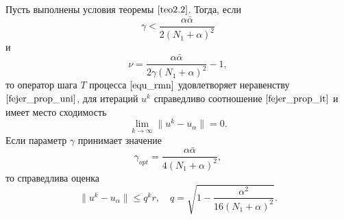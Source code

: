\begin{theorem} \label{teo2.3} 
	Пусть выполнены условия теоремы $\ref{teo2.2}$. Тогда, если
	\begin{equation}\label{ineq2.12}
	\gamma<\frac{\alpha\bar\alpha}{2(N_1+\alpha)^2}
	\end{equation}
	и \begin{equation}\label{eq2.13}
	\nu=\frac{\alpha\bar\alpha}{2\gamma(N_1+\alpha)^2}-1,
	\end{equation}
	то оператор шага $T$ процесса $\eqref{equ_rmn}$ удовлетворяет неравенству $\eqref{fejer_prop_uni}$, для итераций $u^k$ справедливо соотношение $\eqref{fejer_prop_it}$ и имеет место сходимость
	\begin{equation}\label{eq2.14}
	\lim_{k\to\infty}\|u^k-u_\alpha\|=0.
	\end{equation}
	Если параметр $\gamma$ принимает значение \begin{equation}\label{eq2.15}
	{\gamma}_{opt}=\frac{\alpha\bar\alpha}{4(N_1+\alpha)^2},
	\end{equation} то справедлива оценка \begin{equation}\label{est2.16}
	\|u^k-u_\alpha\|\le q^k r, \quad q=\sqrt{1-\frac{{\alpha}^2}  {16(N_1+\alpha)^2}}.\end{equation}
\end{theorem}
